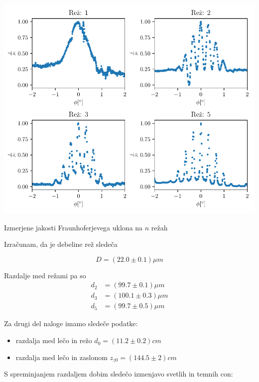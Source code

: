 \documentclass[12pt]{report}
\begin{document}
\begin{slika}[H]
  \centering
  \includegraphics{reze}
  \caption{\small Izmerjene jakosti Fraunhoferjevega uklona na $n$ režah}
\end{slika}

Izračunam, da je debeline rež sledeča

\[
D = (22.0 \pm 0.1) \si{\mu m}
\]

Razdalje med režami pa so 
\begin{align*}
  d_2 &= (99.7 \pm 0.1) \si{\mu m} \\
  d_3 &= (100.1 \pm 0.3) \si{\mu m}\\
  d_5 &= (99.7 \pm 0.5) \si{\mu m}
\end{align*}

Za drugi del naloge imamo sledeče podatke: 
\begin{itemize}
  \item razdalja med lečo in režo $d_0 = (11.2 \pm 0.2) \si{cm}$
  \item razdalja med lečo in zaslonom $z_{z0} = (144.5 \pm 2) \si{cm}$
\end{itemize}

S spreminjanjem razdaljem dobim sledečo izmenjavo svetlih in temnih con: 
\end{document}
